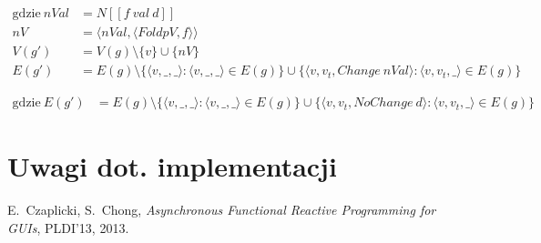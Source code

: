 \documentclass[11pt,leqno]{article}
\begin{document}
\begin{prooftree}
\end{prooftree}

\begin {align*}
\text{gdzie} \: nVal &= N [\![f \: val \: d]\!] \\
nV& = \langle nVal , \langle FoldpV,f \rangle \rangle \\
V(g') &= V(g) \setminus \{ v \} \cup \{ nV \} \\
E(g') &= E(g) \setminus \{ \langle v, \_, \_ \rangle : \langle v, \_ , \_ \rangle \in E(g) \} \cup \{ \langle v, v_t, Change\: nVal \rangle : \langle v, v_t , \_ \rangle \in E(g) \}
\end{align*}

\begin{prooftree}
\end{prooftree}

\begin {align*}
\text{gdzie} \: 
E(g') &= E(g) \setminus \{ \langle v, \_, \_ \rangle : \langle v, \_ , \_ \rangle \in E(g) \} \cup \{ \langle v, v_t, NoChange\: d \rangle : \langle v, v_t , \_ \rangle \in E(g) \}
\end{align*}

\section{Uwagi dot. implementacji}

\thispagestyle{empty}
\begin{thebibliography}{99}

   E.~Czaplicki, S.~Chong, \textit{Asynchronous Functional Reactive Programming for GUIs},
              PLDI’13, 2013.
	  
\end{thebibliography}
\end{document}
